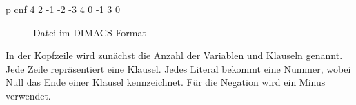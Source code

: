 \begin{verbbox}
  p cnf 4 2
  -1 -2 -3 4 0
  -1 3 0
\end{verbbox}
\begin{figure}[!h]
  \centering
  \theverbbox
  \caption{Datei im DIMACS-Format}
  \label{fig:dimacs}
\end{figure}

In der Kopfzeile wird zunächst die Anzahl der Variablen und Klauseln genannt. Jede Zeile repräsentiert eine Klausel.
Jedes Literal bekommt eine Nummer, wobei Null das Ende einer Klausel kennzeichnet. Für die Negation wird ein Minus verwendet.
